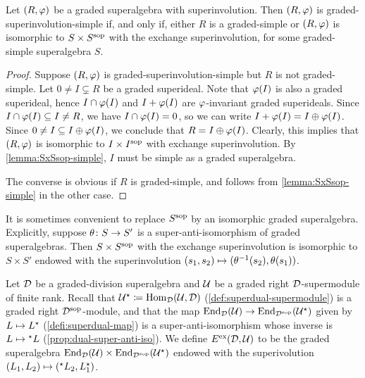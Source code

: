 \begin{prop}\label{prop:only-SxSsop-is-simple}
	Let $(R, \varphi)$ be a 
	graded superalgebra with superinvolution. 
	Then $(R, \varphi)$ is 
	graded-superinvolution-simple if, and only if, either $R$ is a graded-simple or $(R, \varphi)$ is isomorphic to $S\times S^{\mathrm{sop}}$ with the exchange superinvolution, for some graded-simple superalgebra $S$.
\end{prop}

\begin{proof}
	Suppose $(R, \varphi)$ is 
	graded-superinvolution-simple but $R$ is not graded-simple. 
	Let $0 \neq I \subsetneq R$ be a graded superideal.
	Note that $\varphi(I)$ is also a graded superideal, hence $I \cap \varphi(I)$ and $I + \varphi (I)$ are $\varphi$-invariant graded superideals. 
	Since $I \cap \varphi(I) \subseteq I \neq R$, we have $I \cap \varphi(I) = 0$, so we can write $I + \varphi (I) = I \oplus \varphi (I)$. 
	Since $0 \neq I \subseteq I \oplus \varphi (I)$, we conclude that $R = I \oplus \varphi (I)$.
	Clearly, this implies that $(R, \varphi)$ is isomorphic to $I \times I^{\mathrm{sop}}$ with exchange superinvolution. 
	By \cref{lemma:SxSsop-simple}, $I$ must be simple as a graded superalgebra. 
	
	The converse is obvious if $R$ is graded-simple, and follows from \cref{lemma:SxSsop-simple} in the other case.
\end{proof}
 
It is sometimes convenient to replace $S^{\mathrm{sop}}$ by an isomorphic graded superalgebra. 
Explicitly, suppose $\theta\colon S \to S'$ is a super-anti-isomorphism of graded superalgebras. 
Then $S\times S^{\mathrm{sop}}$ with the exchange superinvolution is isomorphic to $S\times S'$ endowed with the superinvolution $(s_1, s_2) \mapsto (\theta^{-1} (s_2), \theta (s_1))$. 

\begin{defi}\label{defi:superdual-exchange}
    Let $\mathcal{D}$ be a graded-division superalgebra and $\mathcal U$ be a graded right $\mathcal{D}$-supermodule of finite rank. 
    Recall that $\mathcal U^\star \coloneqq \operatorname{Hom}_{\mathcal{D}}(\mathcal U, \mathcal{D})$ (\cref{def:superdual-supermodule}) is a graded right $\mathcal{D}^{\mathrm{sop}}$-module, and that the map $\operatorname{End}_{\mathcal{D}} (\mathcal U) \to \operatorname{End}_{\mathcal{D}^{\mathrm{sop}}} (\mathcal U^\star)$ given by $L \mapsto L^\star$ (\cref{defi:superdual-map}) is a super-anti-isomorphism whose inverse is $L \mapsto {}^\star L$ (\cref{prop:dual-super-anti-iso}). 
    We define $E^{\mathrm{ex}} (\mathcal{D}, \mathcal U)$ to be the graded superalgebra $\operatorname{End}_{\mathcal{D}} (\mathcal U) \times \operatorname{End}_{\mathcal{D}^{\mathrm{sop}}} (\mathcal U^\star)$ endowed with the superivolution $(L_1, L_2) \mapsto ({}^\star L_2, L_1^\star)$.
\end{defi}

